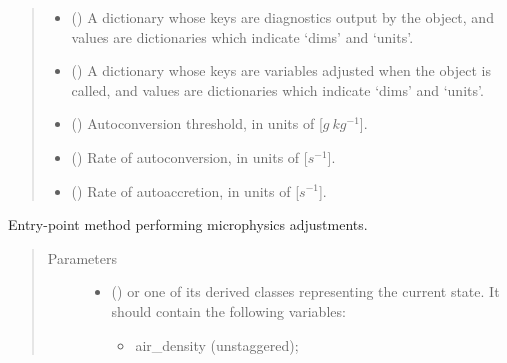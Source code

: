 \documentclass[letterpaper,10pt,english]{sphinxmanual}
\begin{document}
\begin{fulllineitems}
\begin{quote}
\begin{description}
\begin{itemize}
\item {} 
 () \textendash{} A dictionary whose keys are diagnostics output by the object,
and values are dictionaries which indicate ‘dims’ and ‘units’.

\item {} 
 () \textendash{} A dictionary whose keys are variables adjusted when the object is called,
and values are dictionaries which indicate ‘dims’ and ‘units’.

\item {} 
 () \textendash{} Autoconversion threshold, in units of {[}\(g ~ kg^{-1}\){]}.

\item {} 
 () \textendash{} Rate of autoconversion, in units of {[}\(s^{-1}\){]}.

\item {} 
 () \textendash{} Rate of autoaccretion, in units of {[}\(s^{-1}\){]}.

\end{itemize}

\end{description}\end{quote}

\begin{fulllineitems}
\label{\detokenize{api:tasmania.parameterizations.adjustment_microphysics_kessler_wrf.AdjustmentMicrophysicsKesslerWRF.__call__}}
Entry-point method performing microphysics adjustments.
\begin{quote}\begin{description}
\item[{Parameters}] \leavevmode\begin{itemize}
\item {} 
 () \textendash{} 
{\hyperref[\detokenize{api:tasmania.storages.grid_data.GridData}]{}} or one of its derived classes representing the current state.
It should contain the following variables:
\begin{itemize}
\item {} 
air\_density (unstaggered);


\end{itemize}
\end{itemize}
\end{description}
\end{quote}
\end{fulllineitems}
\end{fulllineitems}
\end{document}
